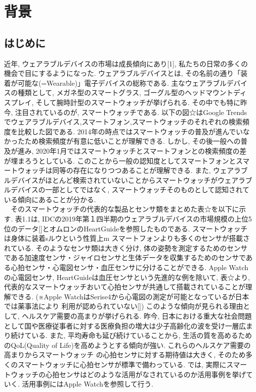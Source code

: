 \documentclass[report, 11pt, a4paper]{jsbook}
\begin{document}
{\large \tableofcontents}
\clearpage

\chapter{背景}
\section{はじめに}
近年, ウェアラブルデバイスの市場は成長傾向にあり[1], 私たちの日常の多くの機会で目にするようになった. ウェアラブルデバイスとは,  その名前の通り「装着が可能な(=Wearable)」電子デバイスの総称である. 主なウェアラブルデバイスの種類として, メガネ型のスマートグラス, ゴーグル型のヘッドマウントディスプレイ, そして腕時計型のスマートウォッチが挙げられる. その中でも特に昨今, 注目されているのが, スマートウォッチである. 以下の図☆はGoogle Trendsでウェアラブルデバイス,スマートフォン,スマートウォッチのそれぞれの検索頻度を比較した図である. 2014年の時点ではスマートウォッチの普及が進んでいなかったため検索頻度が有意に低いことが理解できる. しかし, その後一般への普及が進み, 2020年1月ではスマートウォッチとスマートフォンとの検索頻度の差が埋まろうとしている. このことから一般の認知度としてスマートフォンとスマートウォッチは同等の存在になりつつあることが理解できる. また, ウェアラブルデバイスがほとんど検索されていないことからスマートウォッチがウェアラブルデバイスの一部としてではなく, スマートウォッチそのものとして認知されている傾向にあることが分かる.\\
　そのスマートウォッチの代表的な製品とセンサ類をまとめた表☆を以下に示す. 表1.1は, IDCの2019年第１四半期のウェアラブルデバイスの市場規模の上位5位のデータ[]とオムロンのHeartGuideを参照したものである. スマートウォッチは身体に装着sルウという性質上m スマートフォンよりも多くのセンサが搭載されている. そのようなセンサ類は大きく分け, 体の姿勢を測定するためのセンサである加速度センサ・ジャイロセンサと生体データを収集するためのセンサである心拍センサ・心電図センサ・血圧センサに分けることができる. Apple Watchの心電図センサ, HeartGuideは血圧センサという先進的な例を除いて, 表☆より, 代表的なスマートウォッチおいて心拍センサが共通して搭載されていることが理解できる. (※Apple WatchはSerise4から心電図の測定が可能となっているが日本では薬事法により
利用が認められていない[]) このような傾向が見られる理由として, ヘルスケア需要の高まりが挙げられる. 昨今, 日本における重大な社会問題として国や医療従事者に対する医療負担の増大は少子高齢化の波を受け一層広まり続けている. また, 平均寿命も延び続けていることから, 生活の質を高めるためのQoL(Quality of Life)を高めようとする傾向が強い. これらのヘルスケア需要の高まりからスマートウォッチ の心拍センサに対する期待値は大きく, そのため多くのスマートウォッチに心拍センサが標準で備わっている. では, 実際にスマートウォッチの心拍センサはどのような活用がなされているのか活用事例を挙げていく. 活用事例にはApple Watchを参照して行う.\\
\end{document}
